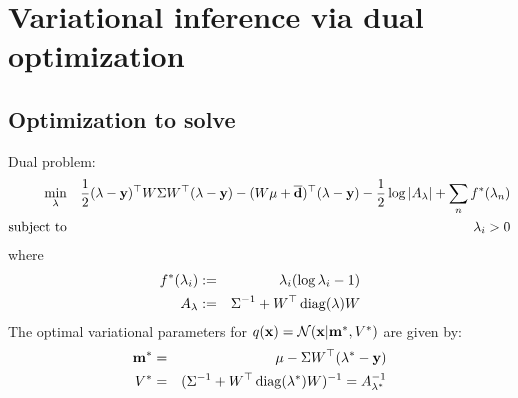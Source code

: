 \documentclass[10pt,english]{article}
\begin{document}
\section{Variational inference via dual optimization}
\subsection{Optimization to solve}
Dual problem:
\begin{eqnarray}
 \min_{\lambda}		&&	\frac{1}{2} (\lambda-\mathbf{y})^\top W\Sigma W^\top(\lambda-\mathbf{y})-(W\mu+\overline{\mathbf{d}})^\top(\lambda-\mathbf{y})-\frac{1}{2}\log\vert A_\lambda\vert+\sum_nf^\ast(\lambda_n)\\
 \mbox{subject to}	&&	\lambda_i>0 \nonumber
\end{eqnarray}
where 
\begin{eqnarray}
 f^\ast(\lambda_i)	&:=&		\lambda_i(\log\lambda_i-1)\\
 A_\lambda		&:=&		\Sigma^{-1}+W^\top \operatorname{diag}(\lambda)W
\end{eqnarray}
The optimal variational parameters for $q(\mathbf{x})=\mathcal{N}(\mathbf{x}\vert\mathbf{m}^\ast,V^\ast)$ are given by:
\begin{eqnarray}
 \mathbf{m}^\ast		&=&		\mu-\Sigma W^\top(\lambda^\ast-\mathbf{y})\\
 V^\ast			&=&		(\Sigma^{-1}+W^\top \operatorname{diag}(\lambda^\ast)W)^{-1}=A_{\lambda^\ast}^{-1}
\end{eqnarray}
\end{document}
